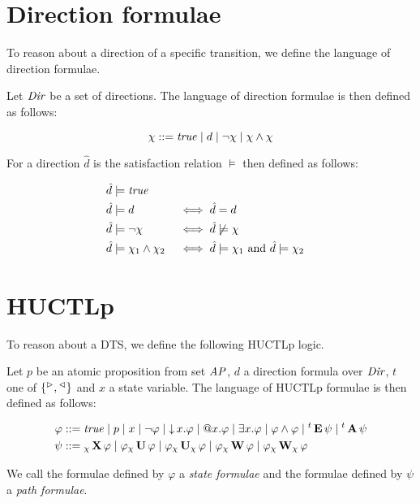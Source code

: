 \section{Direction formulae}

To reason about a direction of a specific transition, we define the language of direction formulae.

Let $\mathit{Dir}$ be a set of directions. The language of direction formulae is then defined as follows:

\[
	\chi ::= \mathit{true} \mid d \mid \neg\chi \mid \chi\wedge\chi
\]

For a direction $\hat d$ is the satisfaction relation $\models$ then defined as follows:

\begin{alignat*}{4}
	\hat d &\models \mathit{true} \\
	\hat d &\models d 								&&\iff \hat d = d \\
	\hat d &\models \neg\chi 					 &&\iff \hat d\not\models\chi \\
	\hat d &\models \chi_1 \land \chi_2 	 &&\iff \hat d\models\chi_1 \text{ and } \hat d\models\chi_2
\end{alignat*}

\section{\Acl{HUCTLp}}

To reason about a \ac{DTS}, we define the following \ac{HUCTLp} logic.

Let $p$ be an atomic proposition from set $\mathit{AP}$, $d$ a direction formula over $\mathit{Dir}$,  $t$ one of $\{ {}^\vartriangleright, {}^\vartriangleleft \}$ and $x$ a state variable. The language of \ac{HUCTLp} formulae is then defined as follows:

\begin{align*}
	\varphi 	&::= 	\mathit{true} \mid p \mid x \mid  \neg \varphi \mid \operatorname{\downarrow} x. \varphi \mid \operatorname{@\!} x. \varphi \mid \exists x. \varphi  \mid \varphi \land \varphi \mid {}^t\operatorname{\mathbf{E}} \psi \mid {}^t\operatorname{\mathbf{A}} \psi \\
	\psi 		  &::= 	  {}_{\chi}\operatorname{\mathbf{X}} \varphi \mid
	\varphi {}_{\chi}\operatorname{\mathbf{U}} \varphi \mid
	\varphi {}_{\chi}\operatorname{\mathbf{U}}_{\chi} \varphi \mid
	\varphi {}_{\chi}\operatorname{\mathbf{W}} \varphi \mid
	\varphi {}_{\chi}\operatorname{\mathbf{W}}_{\chi} \varphi
\end{align*}

We call the formulae defined by $\varphi$ a \emph{state formulae} and the formulae defined by $\psi$ a \emph{path formulae}. 

